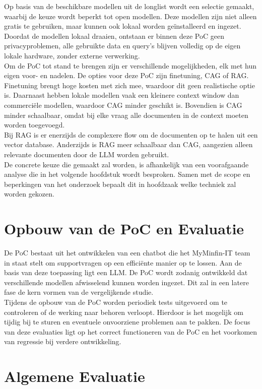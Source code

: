 Op basis van de beschikbare modellen uit de longlist wordt een selectie gemaakt, waarbij de keuze wordt beperkt tot open modellen. Deze modellen zijn niet alleen gratis te gebruiken, maar kunnen ook lokaal worden geïnstalleerd en ingezet. Doordat de modellen lokaal draaien, ontstaan er binnen deze PoC geen privacyproblemen, alle gebruikte data en query’s blijven volledig op de eigen lokale hardware, zonder externe verwerking.
\\[1em]
Om de PoC tot stand te brengen zijn er verschillende mogelijkheden, elk met hun eigen voor- en nadelen. De opties voor deze PoC zijn finetuning, CAG of RAG. Finetuning brengt hoge kosten met zich mee, waardoor dit geen realistische optie is. Daarnaast hebben lokale modellen vaak een kleinere context window dan commerciële modellen, waardoor CAG minder geschikt is. Bovendien is CAG minder schaalbaar, omdat bij elke vraag alle documenten in de context moeten worden toegevoegd.
\\[1em]
Bij RAG is er enerzijds de complexere flow om de documenten op te halen uit een vector database. Anderzijds is RAG meer schaalbaar dan CAG, aangezien alleen relevante documenten door de LLM worden gebruikt.
\\[1em]
De concrete keuze die gemaakt zal worden, is afhankelijk van een voorafgaande analyse die in het volgende hoofdstuk wordt besproken. Samen met de scope en beperkingen van het onderzoek bepaalt dit in hoofdzaak welke techniek zal worden gekozen.

\section{Opbouw van de PoC en Evaluatie}

De PoC bestaat uit het ontwikkelen van een chatbot die het MyMinfin-IT team in staat stelt om supportvragen op een efficiënte manier op te lossen. Aan de basis van deze toepassing ligt een LLM. De PoC wordt zodanig ontwikkeld dat verschillende modellen afwisselend kunnen worden ingezet. Dit zal in een latere fase de kern vormen van de vergelijkende studie.
\\[1em]
Tijdens de opbouw van de PoC worden periodiek tests uitgevoerd om te controleren of de werking naar behoren verloopt. Hierdoor is het mogelijk om tijdig bij te sturen en eventuele onvoorziene problemen aan te pakken. De focus van deze evaluaties ligt op het correct functioneren van de PoC en het voorkomen van regressie bij verdere ontwikkeling.

\section{Algemene Evaluatie}

